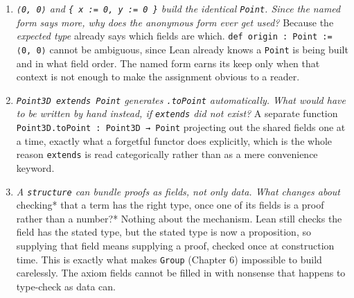\begin{enumerate}
\def\labelenumi{\arabic{enumi}.}
\tightlist
\item
  \emph{\texttt{⟨0, 0⟩} and \texttt{\{ x := 0, y := 0 \}} build the identical \texttt{Point}. Since the named form says more, why does the anonymous form ever get used?} Because the \emph{expected type} already says which fields are which. \texttt{def origin : Point := ⟨0, 0⟩} cannot be ambiguous, since Lean already knows a \texttt{Point} is being built and in what field order. The named form earns its keep only when that context is not enough to make the assignment obvious to a reader.
\item
  \emph{\texttt{Point3D extends Point} generates \texttt{.toPoint} automatically. What would have to be written by hand instead, if \texttt{extends} did not exist?} A separate function \texttt{Point3D.toPoint : Point3D → Point} projecting out the shared fields one at a time, exactly what a forgetful functor does explicitly, which is the whole reason \texttt{extends} is read categorically rather than as a mere convenience keyword.
\item
  \emph{A \texttt{structure} can bundle proofs as fields, not only data. What changes about }checking* that a term has the right type, once one of its fields is a proof rather than a number?* Nothing about the mechanism. Lean still checks the field has the stated type, but the stated type is now a proposition, so supplying that field means supplying a proof, checked once at construction time. This is exactly what makes \texttt{Group} (Chapter 6) impossible to build carelessly. The axiom fields cannot be filled in with nonsense that happens to type-check as data can.
\end{enumerate}

